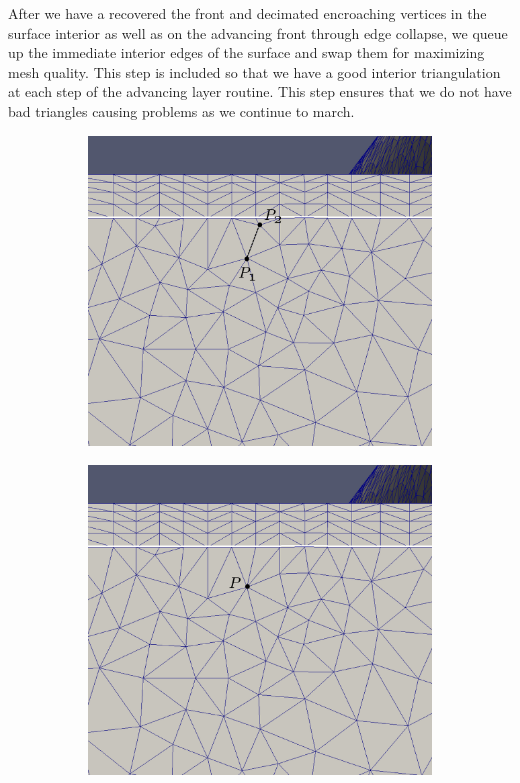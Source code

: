 \documentclass[conf]{new-aiaa}
\begin{document}
After we have a recovered the front and decimated encroaching vertices in the surface interior as well as on the advancing front through edge collapse, we queue up the immediate interior edges of the surface and swap them for maximizing mesh quality. This step is included so that we have a good interior triangulation at each step of the advancing layer routine. This step ensures that we do not have bad triangles causing problems as we continue to march.

\begin{figure}[hbt!]
\centering
\begin{subfigure}{.5\textwidth}
  \centering
  \includegraphics[width=.9\linewidth]{interior-vert-collapse/cc1.eps}
  \caption{}
  \label{cc1}
\end{subfigure}%
\begin{subfigure}{.5\textwidth}
  \centering
  \includegraphics[width=.9\linewidth]{interior-vert-collapse/cc2.eps}

\end{subfigure}
\end{figure}
\end{document}
